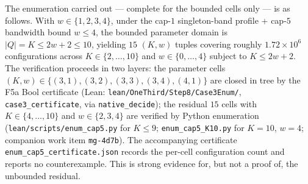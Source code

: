 \begin{remark}
The enumeration carried out --- complete for the bounded cells only
--- is as follows. With $w \in \{1,2,3,4\}$, under the cap-$1$
singleton-band profile + cap-$5$ bandwidth bound $w \le 4$, the
bounded parameter domain is $|Q| = K \le 2w + 2 \le 10$, yielding
$15$ $(K, w)$ tuples covering roughly $1.72\times 10^6$
configurations across $K \in \{2, \ldots, 10\}$ and
$w \in \{0, \ldots, 4\}$ subject to $K \le 2w + 2$. The verification
proceeds in two layers: the parameter cells
$(K, w) \in \{(3,1), (3,2), (3,3), (3,4), (4,1)\}$ are closed in tree
by the F5a Bool certificate (Lean:
\texttt{lean/OneThird/Step8/Case3Enum/}, \texttt{case3\_certificate},
via \texttt{native\_decide}); the residual $15$ cells with
$K \in \{4, \ldots, 10\}$ and $w \in \{2, 3, 4\}$ are verified by
Python enumeration (\texttt{lean/scripts/enum\_cap5.py} for
$K \le 9$; \texttt{enum\_cap5\_K10.py} for $K = 10$, $w = 4$;
companion work item \texttt{mg-4d7b}). The accompanying certificate
\texttt{enum\_cap5\_certificate.json} records the per-cell
configuration count and reports no counterexample. This is strong
evidence for, but not a proof of, the unbounded residual.
\end{remark}

